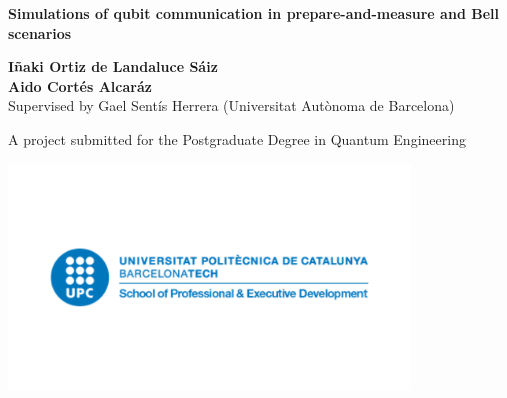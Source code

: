 \begin{titlepage}
   \begin{center}
       \vspace*{1cm}

       \Large
       \textbf{Simulations of qubit communication in prepare-and-measure and Bell scenarios}

       \vspace{0.8cm}

       \normalsize
       \textbf{I\~{n}aki Ortiz de Landaluce S\'aiz\\Aido Cort\'es Alcar\'az\\}
       \vspace{0.5cm}
       \footnotesize{Supervised by Gael Sent\'is Herrera (Universitat Aut\`onoma de Barcelona)}
       \vfill
            
       \footnotesize{A project submitted for the Postgraduate Degree in Quantum Engineering}
            
       \includegraphics[width=0.8\textwidth]{images/upc.png}
            
       \date{\today}
            
   \end{center}
\end{titlepage}